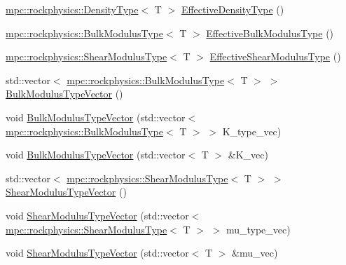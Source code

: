 \begin{DoxyCompactItemize}
\item 
\mbox{\hyperlink{structmpc_1_1rockphysics_1_1_density_type}{mpc\+::rockphysics\+::\+Density\+Type}}$<$ T $>$ \mbox{\hyperlink{classmpc_1_1rockphysics_1_1_scalar_composites_base_aa9757cc729294537fe5045a1e26e0b35}{Effective\+Density\+Type}} ()
\item 
\mbox{\hyperlink{structmpc_1_1rockphysics_1_1_bulk_modulus_type}{mpc\+::rockphysics\+::\+Bulk\+Modulus\+Type}}$<$ T $>$ \mbox{\hyperlink{classmpc_1_1rockphysics_1_1_scalar_composites_base_abf9cbdafe0b2db8ef6022c5ea6ea74f1}{Effective\+Bulk\+Modulus\+Type}} ()
\item 
\mbox{\hyperlink{structmpc_1_1rockphysics_1_1_shear_modulus_type}{mpc\+::rockphysics\+::\+Shear\+Modulus\+Type}}$<$ T $>$ \mbox{\hyperlink{classmpc_1_1rockphysics_1_1_scalar_composites_base_ad4e2dcc6996e525e60709ac39a9054c6}{Effective\+Shear\+Modulus\+Type}} ()
\item 
std\+::vector$<$ \mbox{\hyperlink{structmpc_1_1rockphysics_1_1_bulk_modulus_type}{mpc\+::rockphysics\+::\+Bulk\+Modulus\+Type}}$<$ T $>$ $>$ \mbox{\hyperlink{classmpc_1_1rockphysics_1_1_scalar_composites_base_a946f9e52e72eb9582c4cbe8ef971f815}{Bulk\+Modulus\+Type\+Vector}} ()
\item 
void \mbox{\hyperlink{classmpc_1_1rockphysics_1_1_scalar_composites_base_a0f10f7c62c35d9e86247d768305a34c0}{Bulk\+Modulus\+Type\+Vector}} (std\+::vector$<$ \mbox{\hyperlink{structmpc_1_1rockphysics_1_1_bulk_modulus_type}{mpc\+::rockphysics\+::\+Bulk\+Modulus\+Type}}$<$ T $>$ $>$ K\+\_\+type\+\_\+vec)
\item 
void \mbox{\hyperlink{classmpc_1_1rockphysics_1_1_scalar_composites_base_a8b2c81765221042743e393e3a02153f3}{Bulk\+Modulus\+Type\+Vector}} (std\+::vector$<$ T $>$ \&K\+\_\+vec)
\item 
std\+::vector$<$ \mbox{\hyperlink{structmpc_1_1rockphysics_1_1_shear_modulus_type}{mpc\+::rockphysics\+::\+Shear\+Modulus\+Type}}$<$ T $>$ $>$ \mbox{\hyperlink{classmpc_1_1rockphysics_1_1_scalar_composites_base_ac043aa1d21d511274e9f191956531f51}{Shear\+Modulus\+Type\+Vector}} ()
\item 
void \mbox{\hyperlink{classmpc_1_1rockphysics_1_1_scalar_composites_base_ab2e50c7c822fec6ec48c160dfbebde50}{Shear\+Modulus\+Type\+Vector}} (std\+::vector$<$ \mbox{\hyperlink{structmpc_1_1rockphysics_1_1_shear_modulus_type}{mpc\+::rockphysics\+::\+Shear\+Modulus\+Type}}$<$ T $>$ $>$ mu\+\_\+type\+\_\+vec)
\item 
void \mbox{\hyperlink{classmpc_1_1rockphysics_1_1_scalar_composites_base_ab2bb8171013549edf67c6e8d98a23fb6}{Shear\+Modulus\+Type\+Vector}} (std\+::vector$<$ T $>$ \&mu\+\_\+vec)

\end{DoxyCompactItemize}
